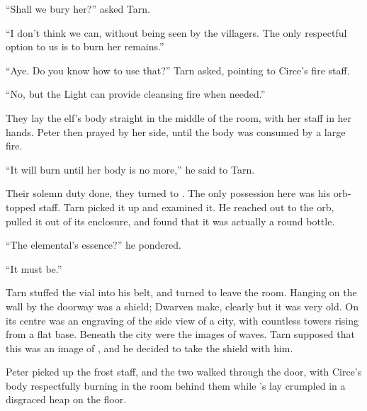 ``Shall we bury her?'' asked Tarn.

``I don't think we can, without being seen by the villagers.  The only respectful option to us is to burn her remains.''

``Aye.  Do you know how to use that?'' Tarn asked, pointing to Circe's fire staff.

``No, but the Light can provide cleansing fire when needed.''

They lay the elf's body straight in the middle of the room, with her staff in her hands.  Peter then prayed by her side, until the body was consumed by a large fire.

``It will burn until her body is no more,'' he said to Tarn.


Their solemn duty done, they turned to \mothzam \driktur.  The only possession here was his orb-topped staff.  Tarn picked it up and examined it.  He reached out to the orb, pulled it out of its enclosure, and found that it was actually a round bottle.

``The elemental's essence?'' he pondered.

``It must be.''

Tarn stuffed the vial into his belt, and turned to leave the room.  Hanging on the wall by the doorway was a shield; Dwarven make, clearly but it was very old.  On its centre was an engraving of the side view of a city, with countless towers rising from a flat base.  Beneath the city were the images of waves.  Tarn supposed that this was an image of \valdunmir, and he decided to take the shield with him.

Peter picked up the frost staff, and the two walked through the door, with Circe's body respectfully burning in the room behind them while \mothzam's lay crumpled in a disgraced heap on the floor.
